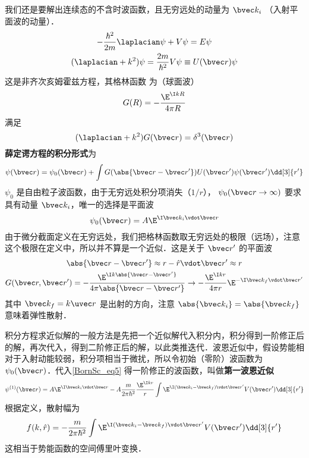 
我们还是要解出连续态的不含时波函数，且无穷远处的动量为 $\bvec k_i$ （入射平面波的动量）．
\begin{gather}
-\frac{\hbar^2}{2m} \laplacian\psi  + V\psi  = E\psi \\
(\laplacian + k^2)\psi  = \frac{2m}{\hbar^2} V\psi  \equiv U(\bvec r)\psi
\end{gather}
这是非齐次亥姆霍兹方程，其格林函数%
为（球面波）
\begin{equation}
G(R) =  -\frac{\E^{\I kR}}{4\pi R}
\end{equation}
满足
\begin{equation}
(\laplacian + k^2)G(\bvec r) = \delta^3(\bvec r)
\end{equation}
\textbf{薛定谔方程的积分形式}为
\begin{equation}\label{BornSc_eq5}
\psi(\bvec r) = \psi_0(\bvec r) + \int G(\abs{\bvec r - \bvec r'})U(\bvec r')\psi (\bvec r') \dd[3]{r'}
\end{equation}
$\psi_0$ 是自由粒子波函数，由于无穷远处积分项消失（$1/r$）， $\psi_0(\bvec r\to\infty)$ 要求具有动量 $\bvec k_i$，唯一的选择是平面波
\begin{equation}
\psi_0(\bvec r) = A\E^{\I\bvec k_i \vdot \bvec r}
\end{equation}
由于微分截面定义在无穷远处，我们把格林函数取无穷远处的极限（远场），注意这个极限在定义中，所以并不算是一个近似．这是关于 $\bvec r'$ 的平面波
\begin{gather}
\abs{\bvec r - \bvec r'} \approx r - \hat r \vdot \bvec r' \approx r\\
G(\bvec r, \bvec r') =  - \frac{\E^{\I k \abs{\bvec r - \bvec r'}}}{4\pi\abs{\bvec r - \bvec r'}} \to  - \frac{\E^{\I kr}}{4\pi r} \E^{-\I \bvec k_f \vdot \bvec r'}
\end{gather}
其中 $\bvec k_f = k\uvec r$ 是出射的方向，注意 $\abs{\bvec k_i} = \abs{\bvec k_f}$ 意味着弹性散射．

积分方程求近似解的一般方法是先把一个近似解代入积分内，积分得到一阶修正后的解，再次代入，得到二阶修正后的解，以此类推迭代．波恩近似中，假设势能相对于入射动能较弱，积分项相当于微扰，所以令初始（零阶）波函数为 $\psi_0(\bvec r)$．代入\autoref{BornSc_eq5} 得一阶修正的波函数，叫做\textbf{第一波恩近似}
\begin{equation}
\psi ^{(1)}(\bvec r) = A\E^{\I\bvec k_i \vdot \bvec r} - A \frac{m}{2\pi\hbar^2} \frac{\E^{\I kr}}{r}\int \E^{\I (\bvec k_i - \bvec k_f) \vdot \bvec r'} V(\bvec r') \dd[3]{r'}
\end{equation}
根据定义，散射幅为
\begin{equation}
f(k, \hat r) =  - \frac{m}{2\pi\hbar^2} \int \E^{\I (\bvec k_i - \bvec k_f) \vdot \bvec r'} V(\bvec r') \dd[3]{r'}
\end{equation}
这相当于势能函数的空间傅里叶变换．

